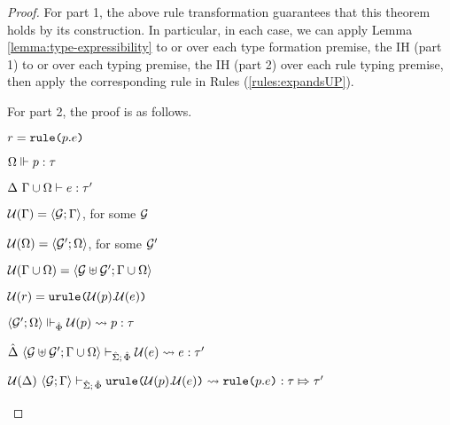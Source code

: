 {{{{\begin{proof}
For part 1, the above rule transformation guarantees that this theorem holds by its construction. In particular, in each case, we can apply Lemma \ref{lemma:type-expressibility} to or over each type formation premise, the IH (part 1) to or over each typing premise, the IH (part 2) over each rule typing premise, then apply the corresponding rule in Rules (\ref{rules:expandsUP}).

For part 2, the proof is as follows.
\begin{pfsteps*}
\item $r = \texttt{rule}\texttt{(}p.e\texttt{)}$ 
\item $\Omega \Vdash p : \tau$  
\item $\Delta~\Gamma \cup \Omega \vdash e : \tau'$  
\item $\mathcal{U}(\Gamma)=\langle \mathcal{G}; \Gamma \rangle$, for some $\mathcal{G}$ 
\item $\mathcal{U}(\Omega) =\langle \mathcal{G}'; \Omega \rangle$, for some $\mathcal{G}'$ 
\item $\mathcal{U}(\Gamma \cup \Omega) = \langle \mathcal{G} \uplus \mathcal{G}'; \Gamma \cup \Omega \rangle$ 
\item $\mathcal{U}(r) = \texttt{urule}\texttt{(}\mathcal{U}(p).\mathcal{U}(e)\texttt{)}$ 
\item $\langle \mathcal{G}'; \Omega \rangle \Vdash_{\hat\Phi} \mathcal{U}(p) \leadsto p : \tau$  
\item $\hat{\Delta}~\langle \mathcal{G} \uplus \mathcal{G}'; {\Gamma}\cup{\Omega} \rangle \vdash_{\hat{\Sigma};\,\hat\Phi} \mathcal{U}(e) \leadsto e : \tau'$  
\item $\mathcal{U}(\Delta)~\langle \mathcal{G}; \Gamma \rangle \vdash_{\hat{\Sigma};\,\hat\Phi} \texttt{urule}\texttt{(}\mathcal{U}(p).\mathcal{U}(e)\texttt{)} \leadsto \texttt{rule}\texttt{(}p.e\texttt{)} : \tau \Mapsto \tau'$ 
\end{pfsteps*}
\resetpfcounter
\end{proof}


}}}}
